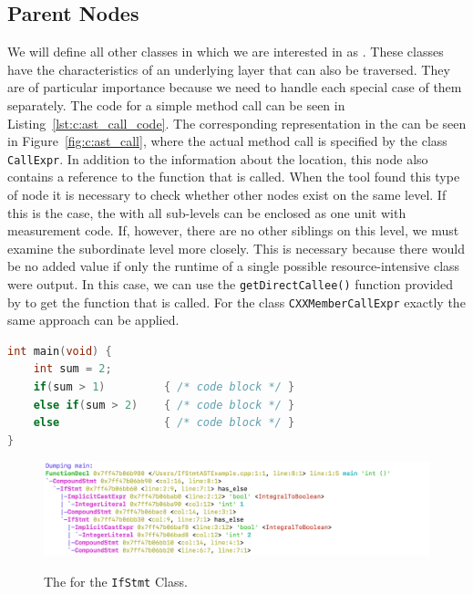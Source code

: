\subsection{Parent Nodes}
We will define all other classes in which we are interested in as \PARSTAS. These classes have the characteristics of an underlying layer that can also be traversed. They are of particular importance because we need to handle each special case of them separately. The code for a simple method call can be seen in Listing~\ref{lst:c:ast_call_code}. The corresponding representation in the \astsmall can be seen in Figure~\ref{fig:c:ast_call}, where the actual method call is specified by the class \lstinline{CallExpr}. In addition to the information about the location, this node also contains a reference to the function that is called. When the tool found this type of node it is necessary to check whether other nodes exist on the same level. If this is the case, the \PARSTA with all sub-levels can be enclosed as one unit with measurement code. If, however, there are no other siblings on this level, we must examine the subordinate level more closely. This is necessary because there would be no added value if only the runtime of a single possible resource-intensive class were output. In this case, we can use the \lstinline{getDirectCallee()} function provided by \CLANG to get the function that is called. For the class \lstinline{CXXMemberCallExpr} exactly the same approach can be applied.

\begin{lstlisting}[float, language=C++, caption=Example Code Showing the Definition of a Branch \STATLARGE., label=lst:c:ast_if_code]
int main(void) {
    int sum = 2;
    if(sum > 1)         { /* code block */ }
    else if(sum > 2)    { /* code block */ }
    else                { /* code block */ }
}
\end{lstlisting}

\begin{figure}[t]
    \centering
    \caption{The \AST for the \lstinline{IfStmt} Class.}
    \includegraphics[width=\textwidth]{graphics/c_ast_if.png}
    \label{fig:c:ast_if}
\end{figure}

